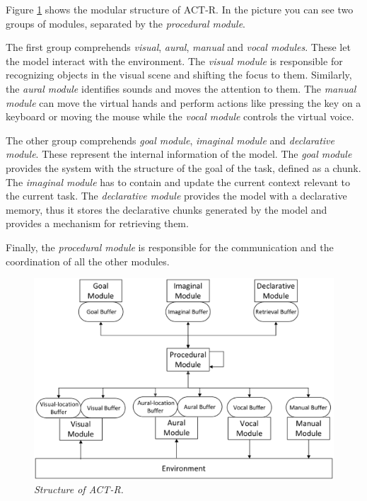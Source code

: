 		Figure \ref{fig:modulesActr} shows the modular structure of ACT-R. In the picture you can see two groups of modules, separated by the \emph{procedural module}. 
	
		The first group comprehends \emph{visual}, \emph{aural}, \emph{manual } and \emph{vocal modules}. These let the model interact with the environment.
		The \emph{visual module} is responsible for recognizing objects in the visual scene and shifting the focus to them. Similarly, the \emph{aural module} identifies sounds and moves the attention to them. 
		The \emph{manual module} can move the virtual hands and perform actions like pressing the key on a keyboard or moving the mouse while the \emph{vocal module} controls the virtual voice.
	
		The other group comprehends \emph{goal module}, \emph{imaginal module} and \emph{declarative module}. These represent the internal information of the model.  
		The \emph{goal module} provides the system with the structure of the goal of the task, defined as a chunk. 
		The \emph{imaginal module} has to contain and update the current context relevant to the current task. 
		The \emph{declarative module} provides the model with a declarative memory, thus it stores the declarative chunks generated by the model and provides a mechanism for retrieving them. 
	
		Finally, the \emph{procedural module} is responsible for the communication and the coordination of all the other modules. 
	
		\begin{figure}[h]
		  \begin{center} 
		    \includegraphics[scale=0.25]{images/ch_01/actr.eps}
		  \end{center} 
		  \caption{\textit{Structure of ACT-R.}}  
		  \label{fig:modulesActr}
		\end{figure}
	
